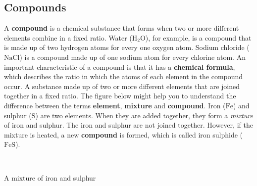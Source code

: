       \label{m38708*uid26}
            \subsection*{Compounds}
            \nopagebreak
 \label{m38708*id63363}A \textbf{compound} is a chemical substance that forms when two or more different elements combine in a fixed ratio. Water ($\text{H}_{2}\text{O}$), for example, is a compound that is made up of two hydrogen atoms for every one oxygen atom. Sodium chloride ($\text{NaCl}$) is a compound made up of one sodium atom for every chlorine atom. An important characteristic of a compound is that it has a \textbf{chemical formula}, which describes the ratio in which the atoms of each element in the compound occur.
 { A substance made up of two or more different elements that are joined together in a fixed ratio.} 
The figure below might help you to understand the difference between the terms \textbf{element}, \textbf{mixture} and \textbf{compound}. Iron ($\text{Fe}$) and sulphur ($\text{S}$) are two elements. When they are added together, they form a \textsl{mixture} of iron and sulphur. The iron and sulphur are not joined together. However, if the mixture is heated, a new \textbf{compound} is formed, which is called iron sulphide ($\text{FeS}$). \par 
 \begin{minipage}{.5\textwidth}
    \begin{center}
\\
\begin{caption}A mixture of iron and sulphur\end{caption}
\label{fig:classification:mixture and compound}
    \end{center}
\end{minipage}
